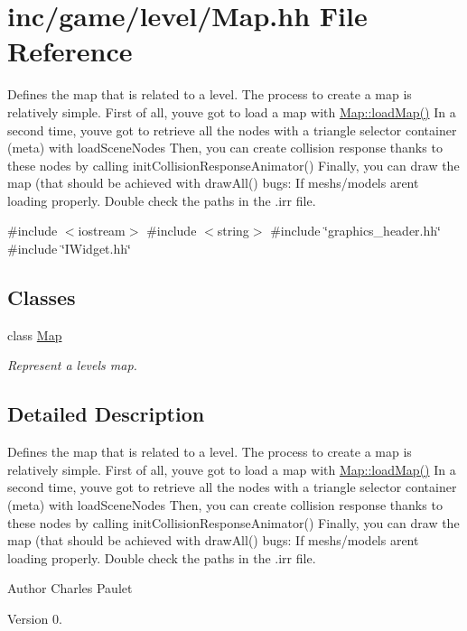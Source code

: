 \hypertarget{Map_8hh}{}\section{inc/game/level/\+Map.hh File Reference}
\label{Map_8hh}


Defines the map that is related to a level. The process to create a map is relatively simple. First of all, you\textquotesingle{}ve got to load a map with \hyperlink{classMap_ae085956bff7ba817bb82fc37bb8231df}{Map\+::load\+Map()} In a second time, you\textquotesingle{}ve got to retrieve all the nodes with a triangle selector container (meta) with load\+Scene\+Nodes Then, you can create collision response thanks to these nodes by calling init\+Collision\+Response\+Animator() Finally, you can draw the map (that should be achieved with draw\+All() bugs\+: If meshs/models arent loading properly. Double check the paths in the .irr file.  


{\ttfamily \#include $<$iostream$>$}\newline
{\ttfamily \#include $<$string$>$}\newline
{\ttfamily \#include \char`\"{}graphics\+\_\+header.\+hh\char`\"{}}\newline
{\ttfamily \#include \char`\"{}I\+Widget.\+hh\char`\"{}}\newline
\subsection*{Classes}
\begin{DoxyCompactItemize}
\item 
class \hyperlink{classMap}{Map}
\begin{DoxyCompactList}\small\item\em Represent a level\textquotesingle{}s map. \end{DoxyCompactList}\end{DoxyCompactItemize}


\subsection{Detailed Description}
Defines the map that is related to a level. The process to create a map is relatively simple. First of all, you\textquotesingle{}ve got to load a map with \hyperlink{classMap_ae085956bff7ba817bb82fc37bb8231df}{Map\+::load\+Map()} In a second time, you\textquotesingle{}ve got to retrieve all the nodes with a triangle selector container (meta) with load\+Scene\+Nodes Then, you can create collision response thanks to these nodes by calling init\+Collision\+Response\+Animator() Finally, you can draw the map (that should be achieved with draw\+All() bugs\+: If meshs/models arent loading properly. Double check the paths in the .irr file. 

\begin{DoxyAuthor}{Author}
Charles Paulet 
\end{DoxyAuthor}
\begin{DoxyVersion}{Version}
0. 
\end{DoxyVersion}

